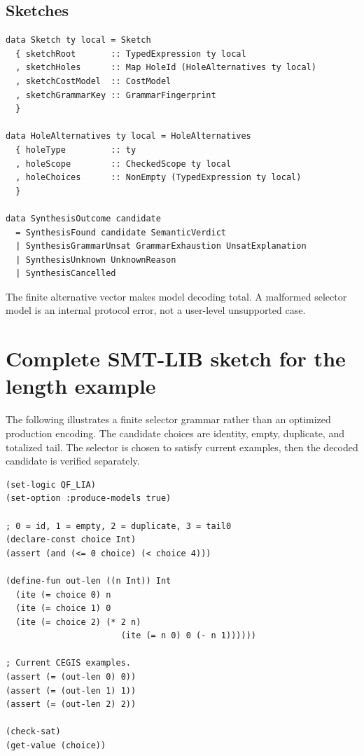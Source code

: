 \documentclass[11pt,oneside]{article}
\begin{document}
\subsection{Sketches}

\begin{lstlisting}[language=HaskellExt]
data Sketch ty local = Sketch
  { sketchRoot       :: TypedExpression ty local
  , sketchHoles      :: Map HoleId (HoleAlternatives ty local)
  , sketchCostModel  :: CostModel
  , sketchGrammarKey :: GrammarFingerprint
  }

data HoleAlternatives ty local = HoleAlternatives
  { holeType         :: ty
  , holeScope        :: CheckedScope ty local
  , holeChoices      :: NonEmpty (TypedExpression ty local)
  }

data SynthesisOutcome candidate
  = SynthesisFound candidate SemanticVerdict
  | SynthesisGrammarUnsat GrammarExhaustion UnsatExplanation
  | SynthesisUnknown UnknownReason
  | SynthesisCancelled
\end{lstlisting}

The finite alternative vector makes model decoding total. A malformed selector model is
an internal protocol error, not a user-level unsupported case.

\section{Complete SMT-LIB sketch for the length example}
\label{app:smt}

The following illustrates a finite selector grammar rather than an optimized production
encoding. The candidate choices are identity, empty, duplicate, and totalized tail.
The selector is chosen to satisfy current examples, then the decoded candidate is
verified separately.

\begin{lstlisting}[language=SMTLIB,caption={Selector synthesis over finite examples}]
(set-logic QF_LIA)
(set-option :produce-models true)

; 0 = id, 1 = empty, 2 = duplicate, 3 = tail0
(declare-const choice Int)
(assert (and (<= 0 choice) (< choice 4)))

(define-fun out-len ((n Int)) Int
  (ite (= choice 0) n
  (ite (= choice 1) 0
  (ite (= choice 2) (* 2 n)
                       (ite (= n 0) 0 (- n 1))))))

; Current CEGIS examples.
(assert (= (out-len 0) 0))
(assert (= (out-len 1) 1))
(assert (= (out-len 2) 2))

(check-sat)
(get-value (choice))
\end{lstlisting}
\end{document}
